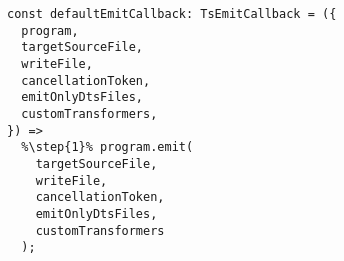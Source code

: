 \begin{verbatim}
const defaultEmitCallback: TsEmitCallback = ({
  program,
  targetSourceFile,
  writeFile,
  cancellationToken,
  emitOnlyDtsFiles,
  customTransformers,
}) =>
  %\step{1}% program.emit(
    targetSourceFile,
    writeFile,
    cancellationToken,
    emitOnlyDtsFiles,
    customTransformers
  );
\end{verbatim}
